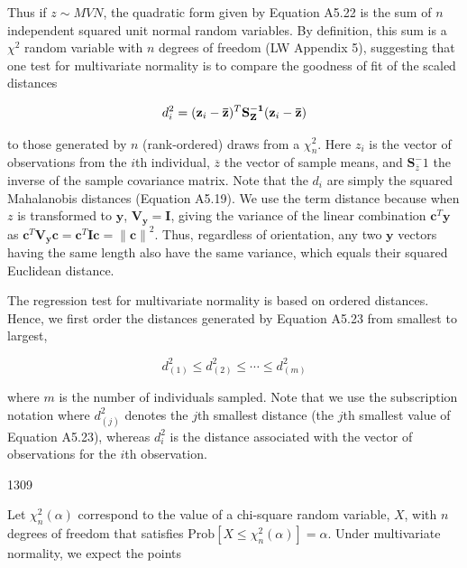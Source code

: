 \documentclass{article}
\begin{document}
Thus if  $ z \sim MVN $, the quadratic form given by Equation A5.22 is the sum of  $ n $ independent squared unit normal random variables. By definition, this sum is a  $ \chi^2 $ random variable with  $ n $ degrees of freedom (LW Appendix 5), suggesting that one test for multivariate normality is to compare the goodness of fit of the scaled distances

\begin{equation}
\begin{align*}d_i^2=({\bf z}_i-{\bf\bar z})^T{\bf S^{-1}_Z}({\bf z}_i-{\bf\bar z})\end{align*}
\end{equation}

to those generated by $n$ (rank-ordered) draws from a $\chi_n^2$. Here $z_i$ is the vector of observations from the $i$th individual, $\overline{z}$ the vector of sample means, and $\mathbf{S}_{\overline{z}}^-1$ the inverse of the sample covariance matrix. Note that the $d_i$ are simply the squared Mahalanobis distances (Equation A5.19). We use the term distance because when $z$ is transformed to $\mathbf{y}$, $\mathbf{V}_{\mathbf{y}} = \mathbf{I}$, giving the variance of the linear combination $\mathbf{c}^T \mathbf{y}$ as $\mathbf{c}^T \mathbf{V}_{\mathbf{y}} \mathbf{c} = \mathbf{c}^T \mathbf{I} \mathbf{c} = \left\| \mathbf{c} \right\|^2$. Thus, regardless of orientation, any two $\mathbf{y}$ vectors having the same length also have the same variance, which equals their squared Euclidean distance.

The regression test for multivariate normality is based on ordered distances. Hence, we first order the distances generated by Equation A5.23 from smallest to largest,

\begin{equation}
d_{(1)}^{2}\leq d_{(2)}^{2}\leq\cdots\leq d_{(m)}^{2}
\end{equation}

where $m$ is the number of individuals sampled. Note that we use the subscription notation where $d_{(j)}^{2}$ denotes the $j$th smallest distance (the $j$th smallest value of Equation A5.23), whereas $d_{i}^{2}$ is the distance associated with the vector of observations for the $i$th observation.

1309

Let  $ \chi_n^2(\alpha) $ correspond to the value of a chi-square random variable,  $ X $, with  $ n $ degrees of freedom that satisfies  $ \text{Prob}[X \leq \chi_n^2(\alpha)] = \alpha $. Under multivariate normality, we expect the points
\end{document}
